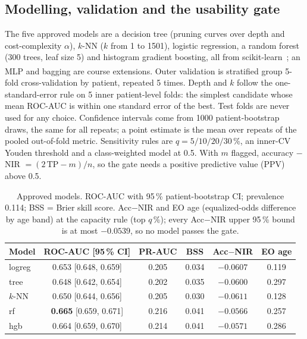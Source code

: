 \documentclass[conference]{IEEEtran}
\newcommand{\add}{\textsuperscript{\dag}}  %
\begin{document}
\subsection{Modelling, validation and the usability gate}
The five approved models are a decision tree (pruning curves over depth and cost-complexity
$\alpha$), $k$-NN ($k$ from 1 to 1501), logistic regression, a random forest (300 trees, leaf size
5) and histogram gradient boosting, all from scikit-learn~\cite{pedregosa2011}; an MLP and bagging
are course extensions\add. %
Outer validation is stratified group 5-fold cross-validation by patient, repeated 5 times.
Depth and $k$ follow the one-standard-error rule on 5 inner patient-level folds: the simplest
candidate whose mean ROC-AUC is within one standard error of the best. Test folds are never used
for any choice. %
Confidence intervals come from 1000 patient-bootstrap draws, the same for all repeats; a point
estimate is the mean over repeats of the pooled out-of-fold metric.
Sensitivity rules are $q = 5/10/20/30$\,\%, an inner-CV Youden threshold and a class-weighted model
at 0.5. With $m$ flagged, accuracy $-$ NIR $= (2\,\mathrm{TP}-m)/n$, so the gate needs a
positive predictive value (PPV) above 0.5. %

\begin{table}[!t]
\caption{Approved models. ROC-AUC with 95\,\% patient-bootstrap CI; prevalence 0.114; BSS =
Brier skill score. Acc$-$NIR and EO age (equalized-odds difference by age band) at the capacity
rule (top $q$\,\%); every Acc$-$NIR upper 95\,\% bound is at most $-0.0539$, so no model passes the gate.}
\label{tab:models}
\centering\footnotesize\setlength{\tabcolsep}{3pt}
\begin{tabular}{@{}lccccc@{}}
\toprule
Model & ROC-AUC [95\,\% CI] & PR-AUC & BSS & Acc$-$NIR & EO age\\
\midrule
logreg & 0.653 [0.648, 0.659] & 0.205 & 0.034 & $-0.0607$ & 0.119\\ %
tree   & 0.648 [0.642, 0.654] & 0.202 & 0.035 & $-0.0600$ & 0.297\\ %
$k$-NN & 0.650 [0.644, 0.656] & 0.205 & 0.030 & $-0.0611$ & 0.128\\ %
rf     & \textbf{0.665} [0.659, 0.671] & 0.216 & 0.041 & $-0.0566$ & 0.257\\ %
hgb    & 0.664 [0.659, 0.670] & 0.214 & 0.041 & $-0.0571$ & 0.286\\ %
\bottomrule
\end{tabular}
\end{table}
\end{document}
